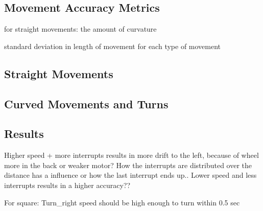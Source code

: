 \subsection{Movement Accuracy Metrics}

for straight movements: the amount of curvature

standard deviation in length of movement for each type of movement

\subsection{Straight Movements}




\subsection{Curved Movements and Turns}


\subsection{Results}
Higher speed + more interrupts results in more drift to the left, because of wheel more in the back or weaker motor?
How the interrupts are distributed over the distance has a influence or how the last interrupt ends up..
Lower speed and less interrupts results in a higher accuracy??


For square: Turn\_right speed should be high enough to turn within 0.5 sec

